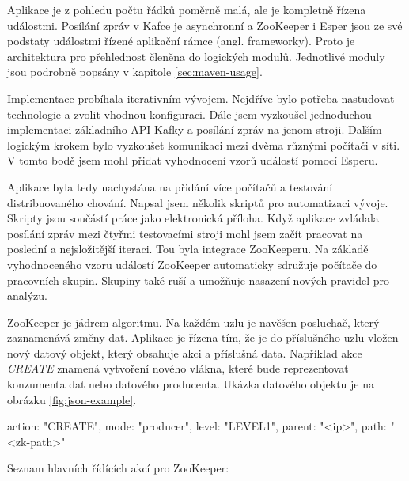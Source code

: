 \documentclass[
  digital, %
  table,   %
  nolof,     %
  nolot,     %
  oneside, %
  nocover,
  monochrome,
  12pt
]{fithesis3}
\begin{document}
Aplikace je z pohledu počtu řádků poměrně malá, ale je kompletně řízena událostmi. Posílání zpráv v Kafce je asynchronní a ZooKeeper i Esper jsou ze své podstaty událostmi řízené aplikační rámce (angl. frameworky). Proto je architektura pro přehlednost členěna do logických modulů. Jednotlivé moduly jsou podrobně popsány v kapitole \ref{sec:maven-usage}.

Implementace probíhala iterativním vývojem. Nejdříve bylo potřeba nastudovat technologie a zvolit vhodnou konfiguraci. Dále jsem vyzkoušel jednoduchou implementaci základního API Kafky a posílání zpráv na jenom stroji. Dalším logickým krokem bylo vyzkoušet komunikaci mezi dvěma různými počítači v síti. V tomto bodě jsem mohl přidat vyhodnocení vzorů událostí pomocí Esperu.

Aplikace byla tedy nachystána na přidání více počítačů a testování distribuovaného chování. Napsal jsem několik skriptů pro automatizaci vývoje. Skripty jsou součástí práce jako elektronická příloha. Když aplikace zvládala posílání zpráv mezi čtyřmi testovacími stroji mohl jsem začít pracovat na poslední a nejsložitější iteraci. Tou byla integrace ZooKeeperu. Na základě vyhodnoceného vzoru událostí ZooKeeper automaticky sdružuje počítače do pracovních skupin. Skupiny také ruší a umožňuje nasazení nových pravidel pro analýzu.

ZooKeeper je jádrem algoritmu. Na každém uzlu je navěšen posluchač, který zaznamenává změny dat. Aplikace je řízena tím, že je do příslušného uzlu vložen nový datový objekt, který obsahuje akci a příslušná data. Například akce \textit{CREATE} znamená vytvoření nového vlákna, které bude reprezentovat konzumenta dat nebo datového producenta. Ukázka datového objektu je na obrázku \ref{fig:json-example}.

\begin{center}
\begin{minipage}[H]{.8\linewidth}
\centering
	\begin{mylisting}
{
	action: "CREATE",
	mode: "producer",
	level: "LEVEL1",
	parent: "<ip>",
	path: "<zk-path>"
}
	\end{mylisting}
	\label{fig:json-example} 
\end{minipage}
\end{center}

Seznam hlavních řídících akcí pro ZooKeeper:
\end{document}
